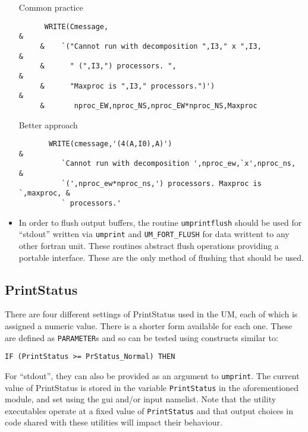 \begin{itemize}
Common practice
\begin{verbatim}
      WRITE(Cmessage,                                                 &
     &    `("Cannot run with decomposition ",I3," x ",I3,             &
     &      " (",I3,") processors. ",                                 &
     &      "Maxproc is ",I3," processors.")')                        &
     &       nproc_EW,nproc_NS,nproc_EW*nproc_NS,Maxproc

\end{verbatim}
Better approach
\begin{verbatim}
       WRITE(cmessage,'(4(A,I0),A)')                                 &
          `Cannot run with decomposition ',nproc_ew,`x',nproc_ns,    &
          `(',nproc_ew*nproc_ns,') processors. Maxproc is `,maxproc, &
          ` processors.'
\end{verbatim}
\item In order to flush output buffers, the routine \verb|umprintflush| should be used for
``stdout'' written via \verb|umprint| and \verb|UM_FORT_FLUSH| for data writtent to any other fortran unit.
These routines abstract flush operations providing a portable interface. These are the only method of flushing that should be used.
\end{itemize}


\subsection{PrintStatus}
\label{sec:prstatus}

There are four different settings of PrintStatus used in the UM, each of  which
is assigned a numeric value. There is a shorter form available for each one.  These are defined
as \verb|PARAMETER|s and so can be tested using constructs similar to:
\begin{verbatim}
IF (PrintStatus >= PrStatus_Normal) THEN
\end{verbatim}
For ``stdout'', they can also be provided as an argument to \verb|umprint|. The current value of PrintStatus is stored in the variable \verb|PrintStatus| in
the aforementioned module, and set using the gui and/or input namelist. Note that the utility executables operate at a fixed value of \verb|PrintStatus| and that output choices in code shared with these utilities will impact their behaviour.

